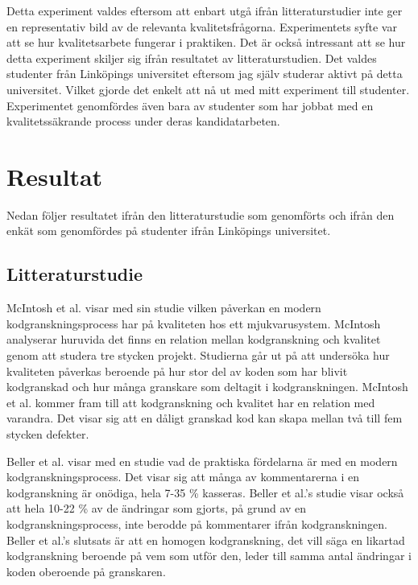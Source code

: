 Detta experiment valdes eftersom att enbart utgå ifrån litteraturstudier inte ger en representativ bild av de relevanta kvalitetsfrågorna. Experimentets syfte var att se hur kvalitets\-arbete fungerar i praktiken. Det är också intressant att se hur detta experiment skiljer sig ifrån resultatet av litteraturstudien. Det valdes studenter från Linköpings universitet eftersom jag själv studerar aktivt på detta universitet. Vilket gjorde det enkelt att nå ut med mitt experiment till studenter. Experimentet genomfördes även bara av studenter som har jobbat med en kvalitetssäkrande process under deras kandidatarbeten.

\section{Resultat}
\label{sec:results-wallstrom}
Nedan följer resultatet ifrån den litteraturstudie som genomförts och ifrån den enkät som genomfördes på studenter ifrån Linköpings universitet. 

\subsection{Litteraturstudie}
McIntosh et al. \cite{mcintosh2014impact} visar med sin studie vilken påverkan en modern kodgranskningsprocess har på kvaliteten hos ett mjukvarusystem. McIntosh analyserar huruvida det finns en relation mellan kodgranskning och kvalitet genom att studera tre stycken projekt. Studierna går ut på att undersöka hur kvaliteten påverkas beroende på hur stor del av koden som har blivit kodgranskad och hur många granskare som deltagit i kodgranskningen. McIntosh et al. \cite{mcintosh2014impact} kommer fram till att kodgranskning och kvalitet har en relation med varandra. Det visar sig att en dåligt granskad kod kan skapa mellan två till fem stycken defekter.

Beller et al. \cite{beller2014modern} visar med en studie vad de praktiska fördelarna är med en modern kodgranskningsprocess. Det visar sig att många av kommentarerna i en kodgranskning är onödiga, hela 7-35 \% kasseras. Beller et al.'s \cite{beller2014modern} studie visar också att hela 10-22 \% av de ändringar som gjorts, på grund av en kodgranskningsprocess, inte berodde på kommentarer ifrån kodgranskningen. Beller et al.'s \cite{beller2014modern} slutsats är att en homogen kodgranskning, det vill säga en likartad kodgranskning beroende på vem som utför den, leder till samma antal ändringar i koden oberoende på granskaren.

